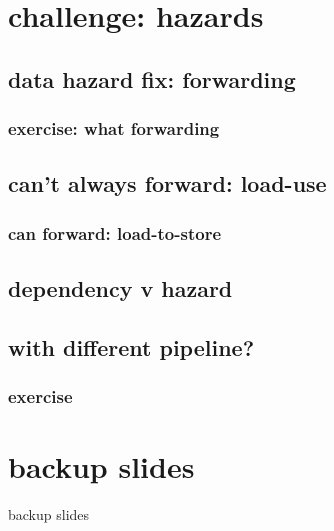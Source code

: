 \section{challenge: hazards}

\subsection{data hazard fix: forwarding}


\subsubsection{exercise: what forwarding}


\subsection{can't always forward: load-use}


\subsubsection{can forward: load-to-store}






\subsection{dependency v hazard}




\subsection{with different pipeline?}


\subsubsection{exercise}




\section{backup slides}
\begin{frame}{backup slides}
\end{frame}
